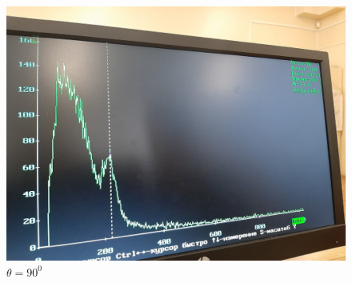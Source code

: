 \documentclass[a4paper, 12pt]{article}
\begin{document}
\begin{figure}[h]
\begin{minipage}[h]{0.3\linewidth}
\includegraphics[width = 1\linewidth]{90.jpg}
\caption{$\theta = 90^0$}
\end{minipage}
\end{figure}
\end{document}
